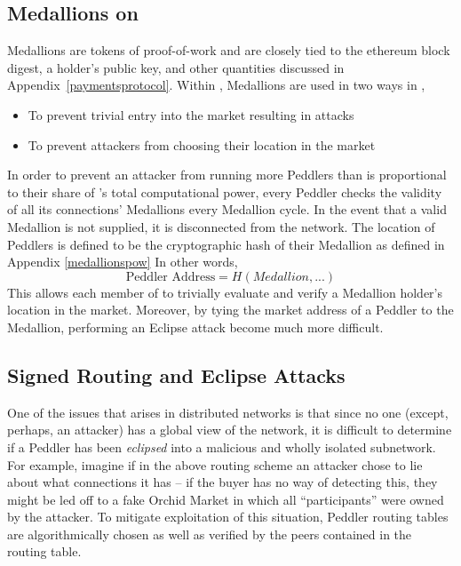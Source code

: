 \subsection{Medallions on \TOM{}}

Medallions are tokens of proof-of-work and are closely tied to the ethereum block digest, a holder's public key, and other quantities discussed in Appendix~\ref{paymentsprotocol}. Within \TOM{}, Medallions are used in two ways in \TOM{},
  \begin{itemize}
      \item To prevent trivial entry into the market resulting in attacks 
      \item To prevent attackers from choosing their location in the market
  \end{itemize}
In order to prevent an attacker from running more Peddlers than is proportional to their share of \tOM{}'s total computational power, every Peddler checks the validity of all its connections' Medallions every Medallion cycle. In the event that a valid Medallion is not supplied, it is disconnected from the network. The location of Peddlers is defined to be the cryptographic hash of their Medallion 
as defined in Appendix \ref{medallionspow}
In other words, 
						$$\textrm{Peddler Address} = H(Medallion, ...)$$
This allows each member of \TOM{} to trivially evaluate and verify a Medallion holder's location in the market. Moreover, by tying the market address of a Peddler to the Medallion, performing an Eclipse attack become much more difficult. 

\subsection{Signed Routing and Eclipse Attacks}

One of the issues that arises in distributed networks is that since no one (except, perhaps, an attacker) has a global view of the network, it is difficult to determine if a Peddler has been \textit{eclipsed} into a malicious and wholly isolated subnetwork. For example, imagine if in the above routing scheme an attacker chose to lie about what connections it has – if the buyer has no way of detecting this, they might be led off to a fake Orchid Market in which all “participants” were owned by the attacker. To mitigate exploitation of this situation, Peddler routing tables are algorithmically chosen as well as verified by the peers contained in the routing table.

